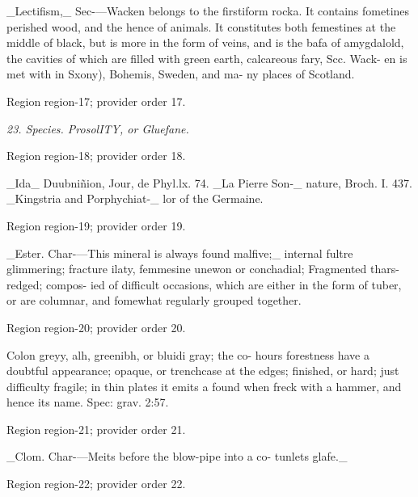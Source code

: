 \documentclass[11pt]{article}
\begin{document}
\_Lectifism,\_ Sec-—Wacken belongs to the firstiform
rocka. It contains fometines perished wood, and the
hence of animals. It constitutes both femestines at the
middle of black, but is more in the form of veins,
and is the bafa of amygdalold, the cavities of which
are filled with green earth, calcareous fary, Scc. Wack-
en is met with in Sxony), Bohemis, Sweden, and ma-
ny places of Scotland.
\par

{\scriptsize\color{gray} Region region-17; provider order 17.\par}
\medskip

{\small\itshape 23. Species. ProsolITY, or Gluefane.\par}

{\scriptsize\color{gray} Region region-18; provider order 18.\par}
\medskip

\_Ida\_ Duubniñion, Jour, de Phyl.lx. 74. \_La Pierre Son-\_
nature, Broch. I. 437. \_Kingstria and Porphychiat-\_
lor of the Germaine.
\par

{\scriptsize\color{gray} Region region-19; provider order 19.\par}
\medskip

\_Ester. Char-—This mineral is always found malfive;\_
internal fultre glimmering; fracture ilaty, femmesine
unewon or conchadial; Fragmented thars-redged; compos-
ied of difficult occasions, which are either in the form
of tuber, or are columnar, and fomewhat regularly
grouped together.
\par

{\scriptsize\color{gray} Region region-20; provider order 20.\par}
\medskip

Colon greyy, alh, greenibh, or bluidi gray; the co-
hours forestness have a doubtful appearance; opaque,
or trenchcase at the edges; finished, or hard; just
difficulty fragile; in thin plates it emits a found
when freck with a hammer, and hence its name.
Spec: grav. 2:57.
\par

{\scriptsize\color{gray} Region region-21; provider order 21.\par}
\medskip

\_Clom. Char-—Meits before the blow-pipe into a co-
tunlets glafe.\_
\par

{\scriptsize\color{gray} Region region-22; provider order 22.\par}
\medskip
\end{document}
